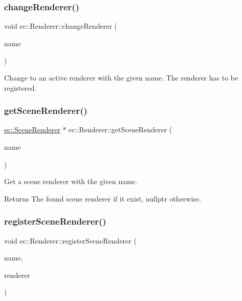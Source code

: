 \subsubsection{\texorpdfstring{change\+Renderer()}{changeRenderer()}}
{\footnotesize\ttfamily void ec\+::\+Renderer\+::change\+Renderer (\begin{DoxyParamCaption}\item[{const std\+::string \&}]{name }\end{DoxyParamCaption})}

Change to an active renderer with the given name. The renderer has to be registered. \mbox{\label{classec_1_1_renderer_ab4e0c57f9d1f061f97e1fa188d52c477}} 
\subsubsection{\texorpdfstring{get\+Scene\+Renderer()}{getSceneRenderer()}}
{\footnotesize\ttfamily \mbox{\hyperlink{classec_1_1_scene_renderer}{ec\+::\+Scene\+Renderer}} $\ast$ ec\+::\+Renderer\+::get\+Scene\+Renderer (\begin{DoxyParamCaption}\item[{const std\+::string \&}]{name }\end{DoxyParamCaption})}

Get a scene renderer with the given name. \begin{DoxyReturn}{Returns}
The found scene renderer if it exist, nullptr otherwise. 
\end{DoxyReturn}
\mbox{\label{classec_1_1_renderer_a5e40791070a8fcb7250b4544bdac8725}} 
\subsubsection{\texorpdfstring{register\+Scene\+Renderer()}{registerSceneRenderer()}}
{\footnotesize\ttfamily void ec\+::\+Renderer\+::register\+Scene\+Renderer (\begin{DoxyParamCaption}\item[{const std\+::string \&}]{name,  }\item[{\mbox{\hyperlink{classec_1_1_scene_renderer}{Scene\+Renderer}} $\ast$}]{renderer }\end{DoxyParamCaption})}

